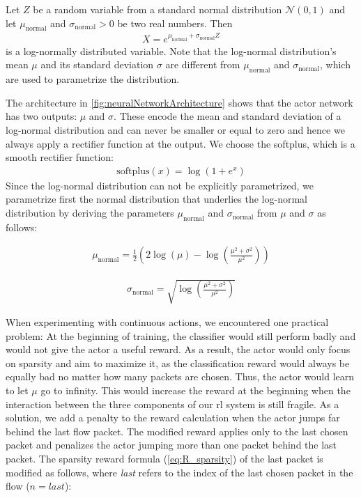 \documentclass[conference]{IEEEtran}
\begin{document}
Let $Z$ be a random variable from a standard normal distribution $\mathcal{N}(0, 1)$ and let $\mu_{\text{normal}}$ and $\sigma_{\text{normal}} > 0$ be two real numbers. Then
\begin{align}
X = e^{\mu_{\text{normal}}+\sigma_{\text{normal}} Z}
\end{align}
is a log-normally distributed variable. Note that the log-normal distribution's mean $\mu$ and its standard deviation $\sigma$ are different from $\mu_\text{normal}$ and $\sigma_\text{normal}$, which are used to parametrize the distribution.

The architecture in \autoref{fig:neuralNetworkArchitecture} shows that the actor network has two outputs: $\mu$ and $\sigma$. These encode the mean and standard deviation of a log-normal distribution and can never be smaller or equal to zero and hence we always apply a rectifier function at the output. We choose the softplus, which is a smooth rectifier function:
\begin{align}
\text{softplus}(x) = \log\left(1 + e^x \right)
\end{align}
Since the log-normal distribution can not be explicitly parametrized, we parametrize first the normal distribution that underlies the log-normal distribution by deriving the parameters $\mu_{\text{normal}}$ and $\sigma_{\text{normal}}$ from $\mu$ and $\sigma$ as follows:

\begin{align}
\mu_{\text{normal}} = \frac{1}{2}\left( 2\log(\mu) - \log\left(\frac{\mu^2 + \sigma^2}{\mu^2}\right) \right)
\end{align}

\begin{align}
\sigma_{\text{normal}} = \sqrt{\log\left(\frac{\mu^2 + \sigma^2}{\mu^2}\right)}
\end{align}

When experimenting with continuous actions, we encountered one practical problem: At the beginning of training, the classifier would still perform badly and would not give the actor a useful reward. As a result, the actor would only focus on sparsity and aim to maximize it, as the classification reward would always be equally bad no matter how many packets are chosen. Thus, the actor would learn to let $\mu$ go to infinity. This would increase the reward at the beginning when the interaction between the three components of our \gls{rl} system is still fragile. As a solution, we add a penalty to the reward calculation when the actor jumps far behind the last flow packet. The modified reward applies only to the last chosen packet and penalizes the actor jumping more than one packet behind the last packet. The sparsity reward formula (\autoref{eq:R_sparsity}) of the last packet is modified as follows, where \textit{last} refers to the index of the last chosen packet in the flow ($n=\textit{last}$):
\end{document}
